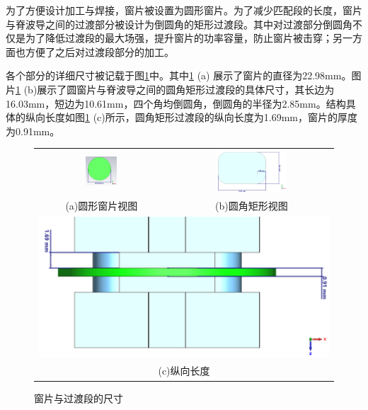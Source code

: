 \documentclass[master]{thesis-uestc}
\begin{document}
为了方便设计加工与焊接，窗片被设置为圆形窗片。为了减少匹配段的长度，窗片与脊波导之间的过渡部分被设计为倒圆角的矩形过渡段。其中对过渡部分倒圆角不仅是为了降低过渡段的最大场强，提升窗片的功率容量，防止窗片被击穿；另一方面也方便了之后对过渡段部分的加工。

各个部分的详细尺寸被记载于图\ref{fig:窗片与过渡段的尺寸}中。其中\ref{fig:窗片与过渡段的尺寸} (a) 展示了窗片的直径为22.98mm。图片\ref{fig:窗片与过渡段的尺寸} (b)展示了圆窗片与脊波导之间的圆角矩形过渡段的具体尺寸，其长边为16.03mm，短边为10.61mm，四个角均倒圆角，倒圆角的半径为2.85mm。结构具体的纵向长度如图\ref{fig:窗片与过渡段的尺寸} (c)所示，圆角矩形过渡段的纵向长度为1.69mm，窗片的厚度为0.91mm。

\begin{figure}[!htbp]
    \small
    \centering
    \begin{tabular}{@{\ }c@{\ }c}
        \includegraphics[width=0.25\textwidth]{pic/chapter3/圆形窗片视图.png} & 
        \hspace{5pt}
        \includegraphics[width=0.45\textwidth]{pic/chapter3/圆角矩形视图.png}     \\
        \mbox{\small (a)圆形窗片视图}                                                                               & 
        \mbox{\small (b)圆角矩形视图}                                                                                  \\[6bp]
        \multicolumn{2}{c}{\includegraphics[scale=0.21]{pic/chapter3/纵向长度视图.png}} \\  %
        \multicolumn{2}{c}{\mbox{\small (c)纵向长度}}
    \end{tabular}
    \caption{窗片与过渡段的尺寸}
    \label{fig:窗片与过渡段的尺寸}
\end{figure}
\end{document}
